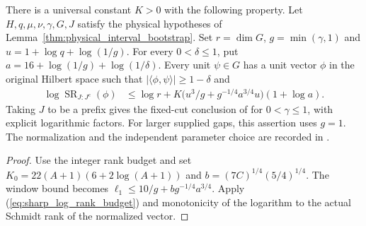 \begin{lemma}
    \label{thm:physical_dg_interval_normalized_approximation}
    \leanok
    There is a universal constant $K>0$ with the following property.
    Let $H,q,\mu,\nu,\gamma,G,J$ satisfy the physical hypotheses of
    Lemma~\ref{thm:physical_interval_bootstrap}.
    Set $r=\dim G$, $g=\min(\gamma,1)$ and $u=1+\log q+\log(1/g)$.
    For every $0<\delta\le1$, put $a=16+\log(1/g)+\log(1/\delta)$.
    Every unit $\psi\in G$ has a unit vector $\phi$ in the original
    Hilbert space such that $|\langle\phi,\psi\rangle|\ge1-\delta$ and
    \begin{align}
        \log\operatorname{SR}_{J:J^c}(\phi)
         & \le\log r+K\bigl(u^3/g+g^{-1/4}a^{3/4}u\bigr)(1+\log a).
        \label{eq:physical_sharp_log_rank}
    \end{align}
    Taking $J$ to be a prefix gives the fixed-cut conclusion of
    \cite[Theorem~4.9]{Arad2016RigorousRG} for $0<\gamma\le1$,
    with explicit logarithmic factors.
    For larger supplied gaps, this assertion uses $g=1$.
    The normalization and the independent parameter choice are recorded in
    \cite{gap:alvv16_approximation_parameters}.
\end{lemma}
\begin{proof}
    \leanok
    Use the integer rank budget and set
    $K_0=22(A+1)(6+2\log(A+1))$ and
    $b=(7C)^{1/4}(5/4)^{1/4}$.
    The window bound becomes $\ell_1\le10/g+bg^{-1/4}a^{3/4}$.
    Apply (\ref{eq:sharp_log_rank_budget}) and monotonicity of the logarithm
    to the actual Schmidt rank of the normalized vector.
\end{proof}

